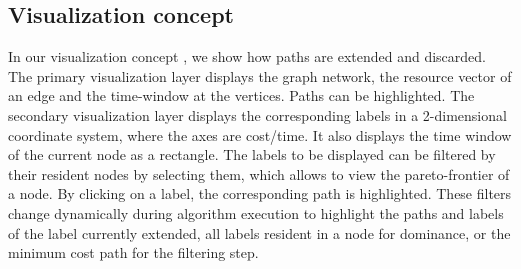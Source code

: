 \clearpage
\subsection{Visualization concept}
In our visualization concept , we show how paths are extended and discarded. The primary visualization layer displays the graph network, the resource vector of an edge and the time-window at the vertices. Paths can be highlighted. The secondary visualization layer displays the corresponding labels in a 2-dimensional coordinate system, where the axes are cost/time. It also displays the time window of the current node as a rectangle. The labels to be displayed can be filtered by their resident nodes by selecting them, which allows to view the pareto-frontier of a node. By clicking on a label, the corresponding path is highlighted. These filters change dynamically during algorithm execution to highlight the paths and labels of the label currently extended, all labels resident in a node for dominance, or the minimum cost path for the filtering step.
